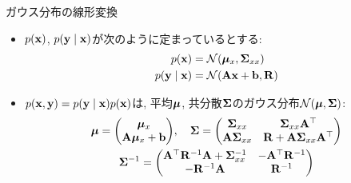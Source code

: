 \documentclass[dvipdfmx,notheorems,t]{beamer}
\begin{document}
\begin{frame}{ガウス分布の線形変換}
\begin{itemize}
  \item $p(\vb{x})$, $p(\vb{y} \mid \vb{x})$が次のように定まっているとする:
  \begin{align*}
    p(\vb{x}) &= \mathcal{N}(\vb*{\mu}_x, \vb{\Sigma}_{xx}) \\
    p(\vb{y} \mid \vb{x}) &= \mathcal{N}(\vb{A} \vb{x} + \vb{b}, \vb{R})
  \end{align*}
  \item $p(\vb{x}, \vb{y}) = p(\vb{y} \mid \vb{x}) p(\vb{x})$は,
  平均$\vb*{\mu}$, 共分散$\vb{\Sigma}$のガウス分布$\mathcal{N}(\vb*{\mu}, \vb{\Sigma})$:
  \begin{gather*}
    \vb*{\mu} = \mqty(\vb*{\mu}_x \\ \vb{A} \vb*{\mu}_x + \vb{b}), \quad
    \vb{\Sigma} = \mqty(\vb{\Sigma}_{xx} & \vb{\Sigma}_{xx} \vb{A}^\top \\
      \vb{A} \vb{\Sigma}_{xx} & \vb{R} + \vb{A} \vb{\Sigma}_{xx} \vb{A}^\top) \\
    \vb{\Sigma}^{-1} = \mqty(\vb{A}^\top \vb{R}^{-1} \vb{A} + \vb{\Sigma}_{xx}^{-1} & -\vb{A}^\top \vb{R}^{-1} \\
      -\vb{R}^{-1} \vb{A} & \vb{R}^{-1})
  \end{gather*}
\end{itemize}
\end{frame}
\end{document}
